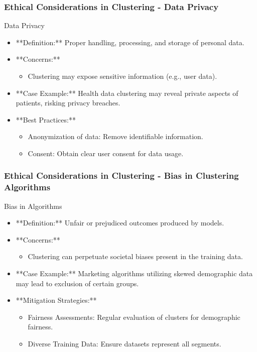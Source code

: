 \documentclass[aspectratio=169]{beamer}
\begin{document}
\begin{frame}[fragile]
    \frametitle{Ethical Considerations in Clustering - Data Privacy}
    \begin{block}{Data Privacy}
        \begin{itemize}
            \item **Definition:** Proper handling, processing, and storage of personal data.
            \item **Concerns:**
                \begin{itemize}
                    \item Clustering may expose sensitive information (e.g., user data).
                \end{itemize}
            \item **Case Example:** Health data clustering may reveal private aspects of patients, risking privacy breaches.
            \item **Best Practices:**
                \begin{itemize}
                    \item Anonymization of data: Remove identifiable information.
                    \item Consent: Obtain clear user consent for data usage.
                \end{itemize}
        \end{itemize}
    \end{block}
\end{frame}

\begin{frame}[fragile]
    \frametitle{Ethical Considerations in Clustering - Bias in Clustering Algorithms}
    \begin{block}{Bias in Algorithms}
        \begin{itemize}
            \item **Definition:** Unfair or prejudiced outcomes produced by models.
            \item **Concerns:**
                \begin{itemize}
                    \item Clustering can perpetuate societal biases present in the training data.
                \end{itemize}
            \item **Case Example:** Marketing algorithms utilizing skewed demographic data may lead to exclusion of certain groups.
            \item **Mitigation Strategies:**
                \begin{itemize}
                    \item Fairness Assessments: Regular evaluation of clusters for demographic fairness.
                    \item Diverse Training Data: Ensure datasets represent all segments.
                \end{itemize}
        \end{itemize}
    \end{block}
\end{frame}
\end{document}
